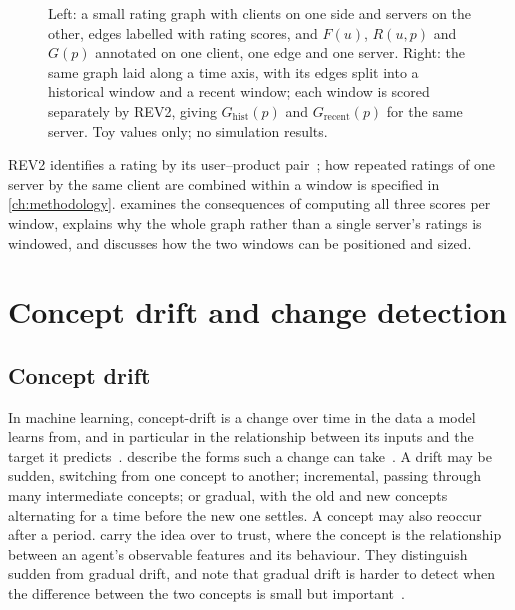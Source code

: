 \begin{figure}[tb]
  \centering
  \caption[REV2 on a rating graph and on its historical and recent windows]{Left: a small rating graph with clients on one side and  servers on the other, edges labelled with rating scores, and $F(u)$, $R(u, p)$ and $G(p)$ annotated on one client, one edge and one server. Right: the same graph laid along a time axis, with its edges split into a historical window and a recent window; each window is scored separately by REV2, giving $G_{\mathrm{hist}}(p)$ and $G_{\mathrm{recent}}(p)$ for the same server. Toy values only; no simulation results.}\label{fig:rev2-windows}
\end{figure}

REV2 identifies a rating by its user--product pair~\cite[p.~333]{Kumar2018}; how repeated ratings of one server by the same client are combined within a window is specified in \cref{ch:methodology}.  examines the consequences of computing all three scores per window, explains why the whole graph rather than a single server's ratings is windowed, and discusses how the two windows can be positioned and sized.

\section{Concept drift and change detection}\label{sec:drift}

\subsection{Concept drift}\label{sec:concept-drift}

In machine learning, \gls{concept-drift} is a change over time in the data a model learns from, and in particular in the relationship between its inputs and the target it predicts~\cite[pp.~44:2, 44:4]{Gama2014}. \textcite{Gama2014} describe the forms such a change can take~\cite[pp.~44:5--44:6]{Gama2014}. A drift may be sudden, switching from one concept to another; incremental, passing through many intermediate concepts; or gradual, with the old and new concepts alternating for a time before the new one settles. A concept may also reoccur after a period. \textcite{Player2020} carry the idea over to trust, where the concept is the relationship between an agent's observable features and its behaviour. They distinguish sudden from gradual drift, and note that gradual drift is harder to detect when the difference between the two concepts is small but important~\cite[p.~6]{Player2020}.

